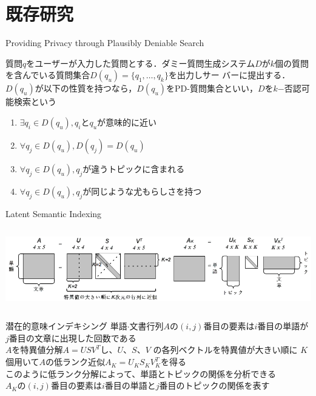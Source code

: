\documentclass[14pt,xcolor=dvipsnames,table,dvipdfmx]{beamer}
\begin{document}
\section{既存研究}
\begin{frame}{Providing Privacy through Plausibly Deniable Search \cite{providing2009}}
	\begin{block}{}
	質問$q$をユーザーが入力した質問とする．ダミー質問生成システム$D$が$k$個の質問を含んでいる質問集合$D(q_u)=\{q_1, \dots , q_k\}$を出力しサー
	バーに提出する．$D(q_u)$が以下の性質を持つなら，$D(q_u)$をPD-質問集合といい，$D$を$k$−否認可能検索という
	\begin{enumerate}
	\item $\exists q_i \in D(q_u),q_i$と$q_u$が意味的に近い
	\item $\forall q_j \in D(q_u),D(q_j) = D(q_u)$
	\item $\forall q_j \in D(q_u),q_j$が違うトピックに含まれる
	\item $\forall q_j \in D(q_u),q_j$が同じような尤もらしさを持つ
	\end{enumerate}
	\end{block}
\end{frame}

\begin{frame}{Latent Semantic Indexing}
    \begin{columns}[c]
        \begin{column}{1.0\textwidth} %
            \includegraphics[width=\columnwidth]{photo11.png}
		\end{column}
    \end{columns}
	\begin{block}{潜在的意味インデキシング}
	\fontsize{12pt}{7.2}\selectfont
		単語$\cdot$文書行列$A$の$(i,j)$番目の要素は$i$番目の単語が$j$番目の文章に出現した回数である　\\
		$A$を特異値分解$A = USV^T$し、$U$、$S$、$V$	の各列ベクトルを特異値が大きい順に
		$K$個用いて$A$の低ランク近似$A_K=U_KS_KV_{K}^T$を得る \\
		このように低ランク分解によって、単語とトピックの関係を分析できる \\
		$A_K$の$(i,j)$番目の要素は$i$番目の単語と$j$番目のトピックの関係を表す
	\end{block}
\end{frame}
\end{document}
